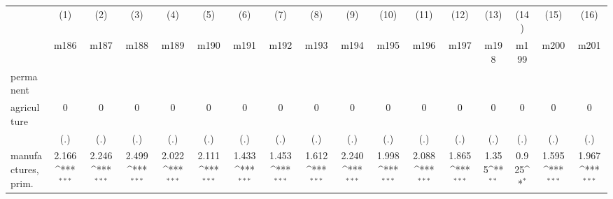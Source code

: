 {
\def\sym#1{\ifmmode^{#1}\else\(^{#1}\)\fi}
\begin{tabular}{l*{16}{c}}
\hline\hline
                    &\multicolumn{1}{c}{(1)}&\multicolumn{1}{c}{(2)}&\multicolumn{1}{c}{(3)}&\multicolumn{1}{c}{(4)}&\multicolumn{1}{c}{(5)}&\multicolumn{1}{c}{(6)}&\multicolumn{1}{c}{(7)}&\multicolumn{1}{c}{(8)}&\multicolumn{1}{c}{(9)}&\multicolumn{1}{c}{(10)}&\multicolumn{1}{c}{(11)}&\multicolumn{1}{c}{(12)}&\multicolumn{1}{c}{(13)}&\multicolumn{1}{c}{(14)}&\multicolumn{1}{c}{(15)}&\multicolumn{1}{c}{(16)}\\
                    &\multicolumn{1}{c}{m186}&\multicolumn{1}{c}{m187}&\multicolumn{1}{c}{m188}&\multicolumn{1}{c}{m189}&\multicolumn{1}{c}{m190}&\multicolumn{1}{c}{m191}&\multicolumn{1}{c}{m192}&\multicolumn{1}{c}{m193}&\multicolumn{1}{c}{m194}&\multicolumn{1}{c}{m195}&\multicolumn{1}{c}{m196}&\multicolumn{1}{c}{m197}&\multicolumn{1}{c}{m198}&\multicolumn{1}{c}{m199}&\multicolumn{1}{c}{m200}&\multicolumn{1}{c}{m201}\\
\hline
permanent           &                     &                     &                     &                     &                     &                     &                     &                     &                     &                     &                     &                     &                     &                     &                     &                     \\
agriculture         &           0         &           0         &           0         &           0         &           0         &           0         &           0         &           0         &           0         &           0         &           0         &           0         &           0         &           0         &           0         &           0         \\
                    &         (.)         &         (.)         &         (.)         &         (.)         &         (.)         &         (.)         &         (.)         &         (.)         &         (.)         &         (.)         &         (.)         &         (.)         &         (.)         &         (.)         &         (.)         &         (.)         \\
[1em]
manufactures, prim. &       2.166\sym{***}&       2.246\sym{***}&       2.499\sym{***}&       2.022\sym{***}&       2.111\sym{***}&       1.433\sym{***}&       1.453\sym{***}&       1.612\sym{***}&       2.240\sym{***}&       1.998\sym{***}&       2.088\sym{***}&       1.865\sym{***}&       1.355\sym{**} &       0.925\sym{*}  &       1.595\sym{***}&       1.967\sym{***}\\

\end{tabular}}
